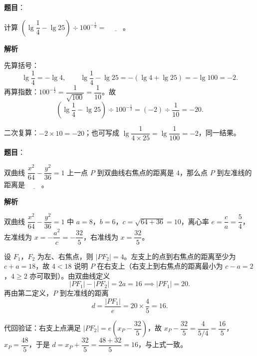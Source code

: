 \begin{answer}

\textbf{题目}：

计算 $\left(\lg\dfrac14-\lg 25\right)\div 100^{-\frac12}=$ $\underline{\qquad}$。

\textbf{解析}

先算括号：
\nopagebreak[4]
\[\lg\frac14=-\lg4,\qquad \lg\frac14-\lg25=-(\lg4+\lg25)=-\lg100=-2.\]
再算指数：$100^{-\frac12}=\dfrac{1}{\sqrt{100}}=\dfrac1{10}$。故
\nopagebreak[4]
\[\left(\lg\frac14-\lg25\right)\div100^{-\frac12}=(-2)\div\frac1{10}=-20.\]

二次复算：$-2\times10=-20$；也可写成 $\lg\dfrac{1}{4\times25}=\lg\dfrac1{100}=-2$，同一结果。


\end{answer}
\begin{answer}

\textbf{题目}：

双曲线 $\dfrac{x^2}{64}-\dfrac{y^2}{36}=1$ 上一点 $P$ 到双曲线右焦点的距离是 $4$，那么点 $P$ 到左准线的距离是 $\underline{\qquad}$。

\textbf{解析}

双曲线 $\dfrac{x^2}{64}-\dfrac{y^2}{36}=1$ 中 $a=8$，$b=6$，$c=\sqrt{64+36}=10$，离心率 $e=\dfrac ca=\dfrac54$，左准线为 $x=-\dfrac{a^2}{c}=-\dfrac{32}{5}$，右准线为 $x=\dfrac{32}{5}$。

设 $F_1$，$F_2$ 为左、右焦点，则 $|PF_2|=4$。左支上的点到右焦点的距离至少为 $c+a=18$，故 $4<18$ 说明 $P$ 在右支上（右支上到右焦点的距离最小为 $c-a=2$，$4\geqslant2$ 亦可取到）。由双曲线定义
\nopagebreak[4]
\[|PF_1|-|PF_2|=2a=16\implies|PF_1|=20.\]
再由第二定义，$P$ 到左准线的距离
\nopagebreak[4]
\[d=\frac{|PF_1|}{e}=20\times\frac45=16.\]

代回验证：右支上点满足 $|PF_2|=e\left(x_P-\dfrac{32}{5}\right)$，故 $x_P-\dfrac{32}{5}=\dfrac{4}{5/4}=\dfrac{16}{5}$，$x_P=\dfrac{48}{5}$，于是 $d=x_P+\dfrac{32}{5}=\dfrac{48+32}{5}=16$，与上式一致。


\end{answer}
